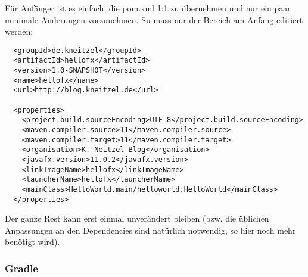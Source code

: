 Für Anfänger ist es einfach, die pom.xml 1:1 zu übernehmen und nur ein paar minimale Änderungen vorzunehmen. Su muss nur der Bereich am Anfang editiert werden:
\begin{lstlisting}
  <groupId>de.kneitzel</groupId>
  <artifactId>hellofx</artifactId>
  <version>1.0-SNAPSHOT</version>
  <name>hellofx</name>
  <url>http://blog.kneitzel.de</url>

  <properties>
    <project.build.sourceEncoding>UTF-8</project.build.sourceEncoding>    
	<maven.compiler.source>11</maven.compiler.source>
    <maven.compiler.target>11</maven.compiler.target>
    <organisation>K. Neitzel Blog</organisation>
    <javafx.version>11.0.2</javafx.version>
    <linkImageName>hellofx</linkImageName>
    <launcherName>hellofx</launcherName>
    <mainClass>HelloWorld.main/helloworld.HelloWorld</mainClass>
  </properties>
\end{lstlisting}
Der ganze Rest kann erst einmal unverändert bleiben (bzw. die üblichen Anpassungen an den Dependencies sind natürlich notwendig, so hier noch mehr benötigt wird).

\subsubsection{Gradle}

